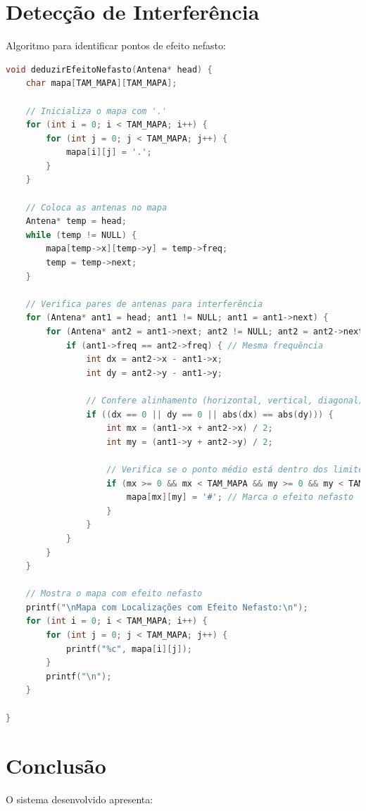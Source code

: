 \documentclass[a4paper, 12pt]{article}
\begin{document}
\section{Detecção de Interferência}
Algoritmo para identificar pontos de efeito nefasto:

\begin{lstlisting}[language=C]
  void deduzirEfeitoNefasto(Antena* head) {
    char mapa[TAM_MAPA][TAM_MAPA];

    // Inicializa o mapa com '.'
    for (int i = 0; i < TAM_MAPA; i++) {
        for (int j = 0; j < TAM_MAPA; j++) {
            mapa[i][j] = '.';
        }
    }

    // Coloca as antenas no mapa
    Antena* temp = head;
    while (temp != NULL) {
        mapa[temp->x][temp->y] = temp->freq;
        temp = temp->next;
    }

    // Verifica pares de antenas para interferência
    for (Antena* ant1 = head; ant1 != NULL; ant1 = ant1->next) {
        for (Antena* ant2 = ant1->next; ant2 != NULL; ant2 = ant2->next) {
            if (ant1->freq == ant2->freq) { // Mesma frequência
                int dx = ant2->x - ant1->x;
                int dy = ant2->y - ant1->y;

                // Confere alinhamento (horizontal, vertical, diagonal)
                if ((dx == 0 || dy == 0 || abs(dx) == abs(dy))) {
                    int mx = (ant1->x + ant2->x) / 2;
                    int my = (ant1->y + ant2->y) / 2;

                    // Verifica se o ponto médio está dentro dos limites do mapa e não é uma antena
                    if (mx >= 0 && mx < TAM_MAPA && my >= 0 && my < TAM_MAPA && mapa[mx][my] == '.') {
                        mapa[mx][my] = '#'; // Marca o efeito nefasto
                    }
                }
            }
        }
    }

    // Mostra o mapa com efeito nefasto
    printf("\nMapa com Localizações com Efeito Nefasto:\n");
    for (int i = 0; i < TAM_MAPA; i++) {
        for (int j = 0; j < TAM_MAPA; j++) {
            printf("%c", mapa[i][j]);
        }
        printf("\n");
    }

}
\end{lstlisting}

\section{Conclusão}
O sistema desenvolvido apresenta:
\end{document}

